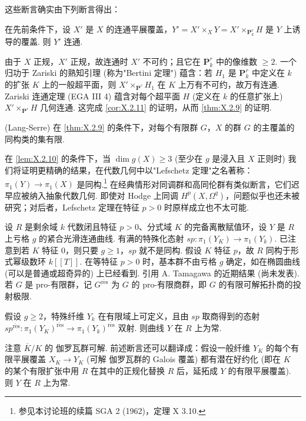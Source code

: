 这些断言确实由下列断言得出：

\begin{corollary}\label{cor:X.2.11}
在先前条件下，设 $X'$ 是 $X$ 的连通平展覆盖，$Y' = X' \times_X Y = X' \times_{\mathbf{P}^r_k} H$ 是 $Y$ 上诱导的覆盖. 则 $Y'$ 连通.
\end{corollary}

由于 $X$ 正规，$X'$ 正规，故连通时 $X'$ 不可约；且它在 $\mathbf{P}^r_k$ 中的像维数 $\geqslant 2$. 一个归功于 Zariski 的熟知引理 (称为"Bertini 定理") 蕴含：若 $H_1$ 是 $\mathbf{P}^r_k$ 中定义在 $k$ 的扩张 $K$ 上的一般超平面，则 $X' \times_{\mathbf{P}^r} H_1$ 在 $K$ 上万有不可约，故万有连通. Zariski 连通定理 (EGA III 4) 蕴含对每个超平面 $H$ (定义在 $k$ 的任意扩张上) $X' \times_{\mathbf{P}^r} H$ 几何连通. 这完成 \ref{cor:X.2.11} 的证明，从而 \ref{thm:X.2.9} 的证明.

\begin{corollary}\label{cor:X.2.12}
(Lang-Serre) 在 \ref{thm:X.2.9} 的条件下，对每个有限群 $G$，$X$ 的群 $G$ 的主覆盖的同构类的集有限.
\end{corollary}

\begin{remark}\label{rem:X.2.13}
在 \ref{lem:X.2.10} 的条件下，当 $\dim g(X) \geqslant 3$ (至少在 $g$ 是浸入且 $X$ 正则时) 我们将证明更精确的结果，在代数几何中以"Lefschetz 定理"之名著称：$\pi_1(Y) \to \pi_1(X)$ 是同构.\footnote{参见本讨论班的续篇 SGA 2 (1962)，定理 X 3.10.} 在经典情形对同调群和高同伦群有类似断言，它们迟早应被纳入抽象代数几何. 即使对 Hodge 上同调 $H^p(X, \Omega^q)$，问题似乎也还未被研究；对后者，Lefschetz 定理在特征 $p > 0$ 时原样成立也不太可能.

\begin{remark}[2003 年 (MR) 增补]
设 $R$ 是剩余域 $k$ 代数闭且特征 $p > 0$、分式域 $K$ 的完备离散赋值环，设 $Y$ 是 $R$ 上亏格 $g$ 的紧合光滑连通曲线. 有满的特殊化态射 $sp \colon \pi_1(Y_K) \to \pi_1(Y_k)$. 已注意到若 $K$ 特征 0，则只要 $g \geqslant 1$，$sp$ 就不是同构. 假设 $K$ 特征 $p$，故 $R$ 同构于形式幂级数环 $k[\![T]\!]$. 在等特征 $p > 0$ 时，基本群不由亏格 $g$ 确定，如在椭圆曲线 (可以是普通或超奇异的) 上已经看到. 引用 A. Tamagawa 的近期结果 (尚未发表). 若 $G$ 是 pro-有限群，记 $G^{\mathrm{r\acute{e}s}}$ 为 $G$ 的 pro-有限商群，即 $G$ 的有限可解拓扑商的投射极限.

\begin{theorem}[A. Tamagawa]
假设 $g \geqslant 2$，特殊纤维 $Y_k$ 在有限域上可定义，且由 $sp$ 取商得到的态射 $sp^{\mathrm{r\acute{e}s}} \colon \pi_1(Y_K)^{\mathrm{r\acute{e}s}} \to \pi_1(Y_k)^{\mathrm{r\acute{e}s}}$ 双射. 则曲线 $Y$ 在 $R$ 上为常.
\end{theorem}

注意 $\overline{K}/K$ 的 伽罗瓦群可解. 前述断言还可以翻译成：假设一般纤维 $Y_K$ 的每个有限平展覆盖 $X_K \to Y_K$ (可解 伽罗瓦群的 Galois 覆盖) 都有潜在好约化 (即在 $K$ 的某个有限扩张中用 $R$ 在其中的正规化替换 $R$ 后，延拓成 $Y$ 的有限平展覆盖). 则 $Y$ 在 $R$ 上为常.
\end{remark}
\end{remark}


